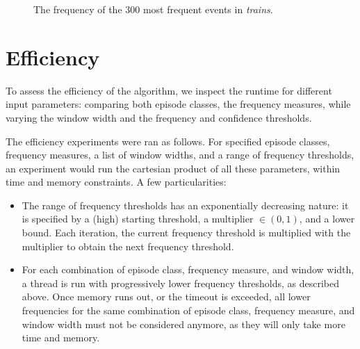 \begin{figure}
\centering


\caption{The frequency of the 300 most frequent events in \emph{trains}.}
\label{fig:frequency-plot-trains}
\end{figure}

\section{Efficiency}

To assess the efficiency of the algorithm, we inspect the runtime for different input parameters: comparing both episode classes, the frequency measures, while varying the window width and the frequency and confidence thresholds.

The efficiency experiments were ran as follows. For specified episode classes, frequency measures, a list of window widths, and a range of frequency thresholds, an experiment would run the cartesian product of all these parameters, within time and memory constraints. A few particularities:

\begin{itemize}
\item The range of frequency thresholds has an exponentially decreasing nature: it is specified by a (high) starting threshold, a multiplier $ \in (0, 1) $, and a lower bound. Each iteration, the current frequency threshold is multiplied with the multiplier to obtain the next frequency threshold.
\item For each combination of episode class, frequency measure, and window width, a thread is run with progressively lower frequency thresholds, as described above. Once memory runs out, or the timeout is exceeded, all lower frequencies for the same combination of episode class, frequency measure, and window width must not be considered anymore, as they will only take more time and memory.
\end{itemize}

